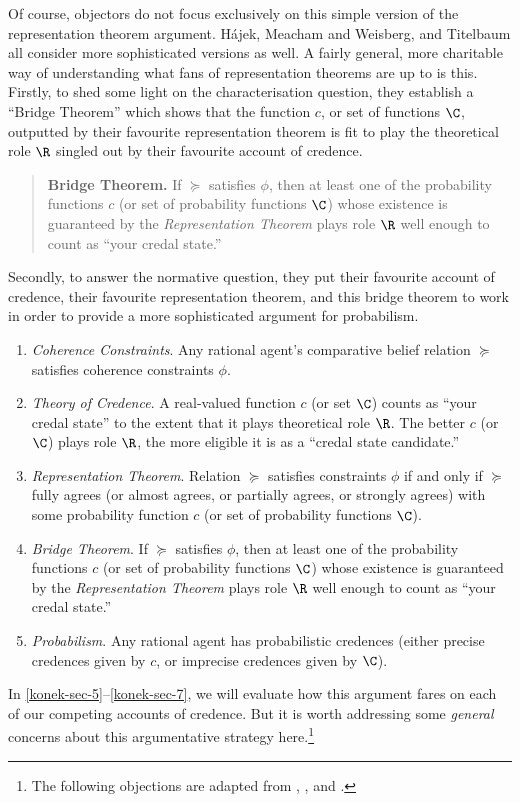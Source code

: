 Of course, objectors do not focus exclusively on this simple version of the representation theorem argument. H\'ajek, Meacham and Weisberg, and Titelbaum all consider more sophisticated versions as well. A fairly general, more charitable way of understanding what fans of representation theorems are up to is this. Firstly, to shed some light on the characterisation question, they establish a ``Bridge Theorem'' which shows that the function $c$, or set of functions $\C$, outputted by their favourite representation theorem is fit to play the theoretical role $\R$ singled out by their favourite account of credence.
\begin{quote}
\textbf{Bridge Theorem.} If $\succeq$ satisfies $\phi$, then at least one of the probability functions $c$ (or set of probability functions $\C$) whose existence is guaranteed by the \textit{Representation Theorem} plays role $\R$ well enough to count as ``your credal state.''
\end{quote}
Secondly, to answer the normative question, they put their favourite account of credence, their favourite representation theorem, and this bridge theorem to work in order to provide a more sophisticated argument for probabilism.
\begin{enumerate}
\item[1.] \textit{Coherence Constraints}. Any rational agent's comparative belief relation $\succeq$ satisfies coherence constraints $\phi$. 
\item[2.] \textit{Theory of Credence}. A real-valued function $c$ (or set $\C$) counts as ``your credal state'' to the extent that it plays theoretical role $\R$. The better $c$ (or $\C$) plays role $\R$, the more eligible it is as a ``credal state candidate.''
\item[3.] \textit{Representation Theorem}. Relation $\succeq$ satisfies constraints $\phi$ if and only if $\succeq$ fully agrees (or almost agrees, or partially agrees, or strongly agrees) with some probability function $c$ (or set of probability functions $\C$).
\item[4.] \textit{Bridge Theorem}. If $\succeq$ satisfies $\phi$, then at least one of the probability functions $c$ (or set of probability functions $\C$) whose existence is guaranteed by the \textit{Representation Theorem} plays role $\R$ well enough to count as ``your credal state.''
\item[C.] \textit{Probabilism}. Any rational agent has probabilistic credences (either precise credences given by $c$, or imprecise credences given by $\C$).
\end{enumerate}
In \autoref{konek-sec-5}--\ref{konek-sec-7}, we will evaluate how this argument fares on each of our competing accounts of credence. But it is worth addressing some \textit{general} concerns about this argumentative strategy here.\footnote{The following objections are adapted from \citet{Hajek2009b}, \citet{Meacham2011}, and \citet{Titelbaum2015}.}

